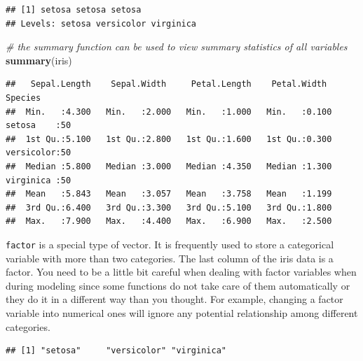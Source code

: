 \documentclass[
]{book}
\newenvironment{Shaded}{\begin{snugshade}}{\end{snugshade}}
\newcommand{\CommentTok}[1]{\textcolor[rgb]{0.56,0.35,0.01}{\textit{#1}}}
\newcommand{\KeywordTok}[1]{\textcolor[rgb]{0.13,0.29,0.53}{\textbf{#1}}}
\newcommand{\NormalTok}[1]{#1}
\newcommand{\OperatorTok}[1]{\textcolor[rgb]{0.81,0.36,0.00}{\textbf{#1}}}
\begin{document}
\begin{verbatim}
## [1] setosa setosa setosa
## Levels: setosa versicolor virginica
\end{verbatim}

\begin{Shaded}
\begin{Highlighting}[]
  \CommentTok{# the summary function can be used to view summary statistics of all variables}
  \KeywordTok{summary}\NormalTok{(iris)}
\end{Highlighting}
\end{Shaded}

\begin{verbatim}
##   Sepal.Length    Sepal.Width     Petal.Length    Petal.Width          Species  
##  Min.   :4.300   Min.   :2.000   Min.   :1.000   Min.   :0.100   setosa    :50  
##  1st Qu.:5.100   1st Qu.:2.800   1st Qu.:1.600   1st Qu.:0.300   versicolor:50  
##  Median :5.800   Median :3.000   Median :4.350   Median :1.300   virginica :50  
##  Mean   :5.843   Mean   :3.057   Mean   :3.758   Mean   :1.199                  
##  3rd Qu.:6.400   3rd Qu.:3.300   3rd Qu.:5.100   3rd Qu.:1.800                  
##  Max.   :7.900   Max.   :4.400   Max.   :6.900   Max.   :2.500
\end{verbatim}

\texttt{factor} is a special type of vector. It is frequently used to store a categorical variable with more than two categories. The last column of the iris data is a factor. You need to be a little bit careful when dealing with factor variables when during modeling since some functions do not take care of them automatically or they do it in a different way than you thought. For example, changing a factor variable into numerical ones will ignore any potential relationship among different categories.

\begin{Shaded}
\end{Shaded}

\begin{verbatim}
## [1] "setosa"     "versicolor" "virginica"
\end{verbatim}

\begin{Shaded}
\end{Shaded}
\end{document}
